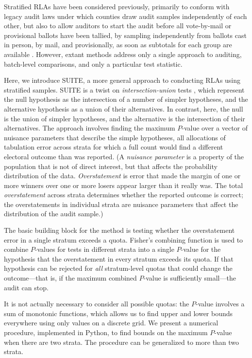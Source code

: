 \documentclass[runningheads]{llncs}
\begin{document}
Stratified RLAs have been considered previously, primarily to conform with legacy audit laws under which counties draw audit samples independently of each other, but also to allow auditors to start the audit before all vote-by-mail or provisional ballots have been tallied, by sampling independently from ballots cast in person, by mail, and provisionally, as soon as subtotals for each group are available \cite{stark08a,higginsEtal11}.
However, extant methods address only a single approach to auditing, batch-level comparisons, and only a particular test statistic.

Here, we introduce SUITE, a more general approach to conducting RLAs using stratified samples.
SUITE is a twist on \emph{intersection-union} tests \cite{pesarinSalmaso10}, which represent the null hypothesis
as the intersection of a number of simpler hypotheses, and the alternative hypothesis as a union of their alternatives.
In contrast, here, the null is the union of simpler hypotheses, and the alternative is the intersection of their alternatives.
The approach involves finding the maximum $P$-value over a vector of nuisance parameters that describe the simple hypotheses, 
all allocations of tabulation error across strata for which a full count would find a different electoral outcome than was reported.
(A \emph{nuisance parameter} is a property of the population that is not of direct interest, but that affects the probability distribution of the data. 
\emph{Overstatement} is error that made the margin of one or more winners over one or more losers appear larger than it really was.
The total \emph{overstatement} across strata determines whether the reported outcome is correct; 
the overstatements in individual strata are nuisance parameters that affect the distribution of the audit sample.)

The basic building block for the method is testing whether the overstatement error in a single stratum exceeds a quota.
Fisher's combining function is used to combine $P$-values for tests in different strata into a single $P$-value for the hypothesis that the overstatement in every stratum exceeds its quota.
If that hypothesis can be rejected for \emph{all} stratum-level quotas that could change the outcome---that is, if the maximum combined $P$-value is sufficiently small---the audit can stop.

It is not actually necessary to consider all possible quotas: the $P$-value involves a sum of monotonic functions, which allows us to find upper and lower bounds everywhere using only values on a discrete grid.
We present a numerical procedure, implemented in Python,
to find bounds on the maximum $P$-value when there are two strata.
The procedure can be generalized to more than two strata.
\end{document}
